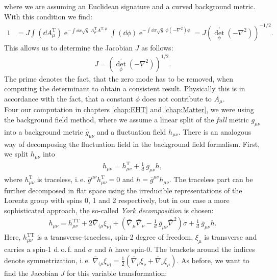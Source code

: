 where we are assuming an Euclidean signature and a curved background metric. With this condition we find:
\begin{align}
	1&=J \int\left(\dd A_{\mu}^{\mathrm{T}}\right) \operatorname{e}^{-\int \dd x \sqrt{g} \ A_{\mu}^{\mathrm{T}} A^{\mathrm{T}, \mu}} 
	\int(\dd\phi) \operatorname{e}^{-\int \dd x \sqrt{g} \  \phi\left(-\nabla^{2}\right) \phi} = J\left(\operatorname{det}_{\phi}^{\prime}\left(-\nabla^{2}\right)\right)^{-1/2}.
\end{align}
This allows us to determine the Jacobian $J$ as follows:
\begin{align}
	J = \left(\operatorname{det}_{\phi}^{\prime}\left(-\nabla^{2}\right)\right)^{1/2}.
\end{align}
The prime denotes the fact, that the zero mode has to be removed, when computing the determinant to obtain a consistent result. Physically this is in accordance with the fact, that a constant $\phi$ does not contribute to $A_{\mu}$.\\
Four our computation in chapters \ref{chap:EHT} and \ref{chap:Matter}, we were using the background field method, where we assume a linear split of the \textit{full} metric $g_{\mu\nu}$ into a background metric $\bar{g}_{\mu\nu}$ and a fluctuation field $h_{\mu\nu}$. There is an analogous way of decomposing the fluctuation field in the background field formalism. First, we split $h_{\mu\nu}$ into
\begin{align}
	h_{\mu\nu} = h_{\mu\nu}^{\mathrm{T}} + \frac{1}{d}\ \bar{g}_{\mu\nu}h,
\end{align} 
where $h_{\mu\nu}^{\mathrm{T}}$ is traceless, i.\,e. $\bar{g}^{\mu\nu}h_{\mu\nu}^{\mathrm{T}}=0$ and $h=\bar{g}^{\mu\nu}h_{\mu\nu}$. The traceless part can be further decomposed in flat space using the irreducible representations of the Lorentz group with spins 0, 1 and 2 respectively, but in our case a more sophisticated approach, the so-called \textit{York decomposition} is chosen:
\begin{align}
	h_{\mu\nu} = h_{\mu\nu}^{\text{TT}} + 2\bar{\nabla}_{(\mu}\xi_{\nu)} + \left(\bar{\nabla}_{\mu}\bar{\nabla}_{\nu} - \frac{1}{d} \ \bar{g}_{\mu\nu}\bar{\nabla}^2\right)\sigma + \frac{1}{d} \ \bar{g}_{\mu\nu}h.
\end{align}
Here, $ h_{\mu\nu}^{\text{TT}}$ is a transverse-traceless, spin-2 degree of freedom, $\xi_{\mu}$ is transverse and carries a spin-1 d.\,o.\,f. and $\sigma$ and $h$ have spin-0. The brackets around the indices denote symmetrization, i.\,e. $\bar{\nabla}_{(\mu}\xi_{\nu)} = \frac{1}{2}\left(\bar{\nabla}_{\mu}\xi_{\nu} + \bar{\nabla}_{\nu}\xi_{\mu}\right)$. As before, we want to find the Jacobian $J$ for this variable transformation:
